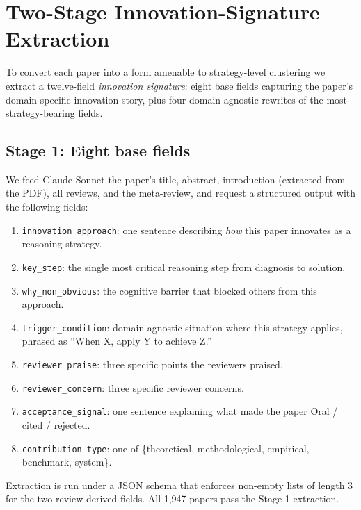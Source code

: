 \documentclass[10pt,a4paper]{article}
\begin{document}
\section{Two-Stage Innovation-Signature Extraction}
\label{sec:extract}

To convert each paper into a form amenable to strategy-level clustering we extract a twelve-field \emph{innovation signature}: eight base fields capturing the paper's domain-specific innovation story, plus four domain-agnostic rewrites of the most strategy-bearing fields.

\subsection{Stage 1: Eight base fields}

We feed Claude Sonnet the paper's title, abstract, introduction (extracted from the PDF), all reviews, and the meta-review, and request a structured output with the following fields:

\begin{enumerate}[nosep, leftmargin=1.5em]
\item \texttt{innovation\_approach}: one sentence describing \emph{how} this paper innovates as a reasoning strategy.
\item \texttt{key\_step}: the single most critical reasoning step from diagnosis to solution.
\item \texttt{why\_non\_obvious}: the cognitive barrier that blocked others from this approach.
\item \texttt{trigger\_condition}: domain-agnostic situation where this strategy applies, phrased as ``When X, apply Y to achieve Z.''
\item \texttt{reviewer\_praise}: three specific points the reviewers praised.
\item \texttt{reviewer\_concern}: three specific reviewer concerns.
\item \texttt{acceptance\_signal}: one sentence explaining what made the paper Oral / cited / rejected.
\item \texttt{contribution\_type}: one of \{theoretical, methodological, empirical, benchmark, system\}.
\end{enumerate}

Extraction is run under a JSON schema that enforces non-empty lists of length 3 for the two review-derived fields. All 1{,}947 papers pass the Stage-1 extraction.
\end{document}
